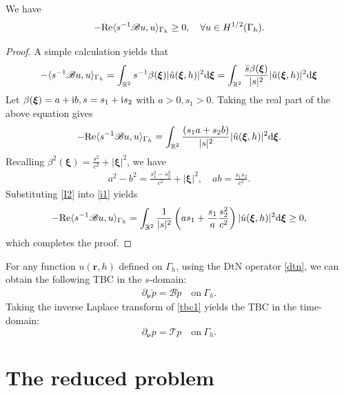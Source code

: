 \documentclass[final,leqno]{siamltex}
\begin{document}
\begin{lemma}\label{tp}
 We have
 \[
  -{\rm Re} \langle s^{-1} \mathscr{B} u,  u \rangle_{\Gamma_h} \geq 0, \quad
\forall u \in H^{1/2}(\Gamma_h).
 \]
\end{lemma}

\begin{proof}
A simple calculation yields that
 \[
  - \langle s^{-1} \mathscr{B} u, u \rangle_{\Gamma_h}
  =    \int_{\mathbb R^2}  s^{-1} \beta (\boldsymbol\xi) |\hat u (\boldsymbol
\xi, h)|^2 {\rm d}\boldsymbol \xi= \int_{\mathbb R^2}  \frac{\bar s \beta
(\boldsymbol \xi)}{|s|^2}  |\hat u
(\boldsymbol\xi, h)|^2 {\rm d} \boldsymbol \xi
 \]
Let $\beta (\boldsymbol\xi) =a+{\rm i } b, s=s_1 +{\rm i} s_2$ with $a>0,
s_1>0$.
Taking the real part of the above equation gives
\begin{align}\label{i1}
- {\rm Re} \langle s^{-1}\mathscr{B} u, u \rangle_{\Gamma_h} = \int_{\mathbb
R^2} \frac{(s_1 a + s_2 b )}{|s|^2} |\hat u (\boldsymbol \xi, h)|^2 {\rm d}
\boldsymbol \xi.
\end{align}
Recalling $\beta^2 (\boldsymbol \xi) = \frac{s^2}{c^2 } + | \boldsymbol \xi|^2$,
we have
\begin{align}
  a^2-b^2 = \frac{s_1^2 -s_2^2 }{c^2} +|\boldsymbol  \xi|^2, \quad
  a b=\frac{s_1 s_2}{c^2}. \label{I2}
\end{align}
Substituting \eqref{I2} into \eqref{i1} yields
\begin{align*}
 - {\rm Re} \langle s^{-1}\mathscr{B} u, u \rangle_{\Gamma_h} =\int_{\mathbb
R^2} \frac{1}{|s|^2} \left( a s_1 + \frac{s_1}{a } \frac{s_2^2}{c^2} \right)
|\hat u ( \boldsymbol \xi, h)|^2 {\rm d}\boldsymbol  \xi \geq 0,
\end{align*}
which completes the proof.
\end{proof}

For any function $ u (\boldsymbol r, h)$ defined on $\Gamma_h$,
using the DtN operator \eqref{dtn}, we can obtain the following TBC in the
$s$-domain:
\begin{align}\label{tbc1}
 \partial_{\boldsymbol \nu } \breve p =\mathscr{B} \breve p \quad \text
{on}~\Gamma_h.
\end{align}
Taking the inverse Laplace transform of \eqref{tbc1} yields the TBC in the
time-domain:
\[
 \partial_{\boldsymbol \nu} p = \mathscr T p \quad  \text {on}~ \Gamma_h.
\]

\section{The reduced problem} \label{srp}
\end{document}
